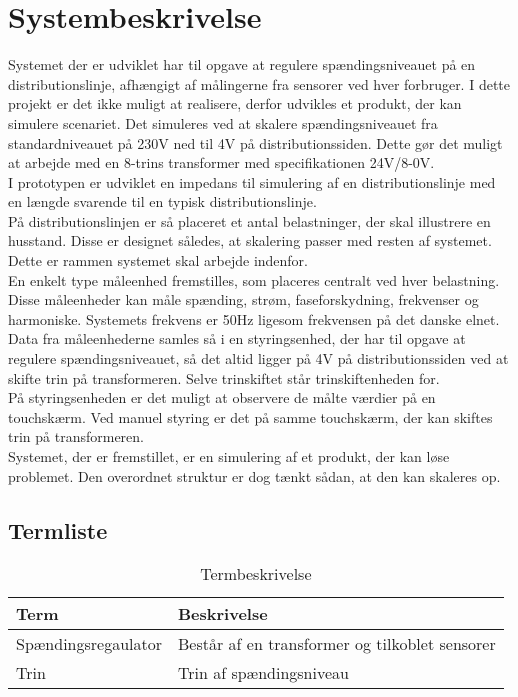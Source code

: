 
\section{Systembeskrivelse}

Systemet der er udviklet har til opgave at regulere spændingsniveauet på en distributionslinje, afhængigt af målingerne fra sensorer ved hver forbruger.
I dette projekt er det ikke muligt at realisere, derfor udvikles et produkt, der kan simulere scenariet. Det simuleres ved at skalere spændingsniveauet fra standardniveauet på 230V ned til 4V på distributionssiden. Dette gør det muligt at arbejde med en 8-trins transformer med specifikationen 24V/8-0V.\\
I prototypen er udviklet en impedans til simulering af en distributionslinje med en længde svarende til en typisk distributionslinje.\\
På distributionslinjen er så placeret et antal belastninger, der skal illustrere en husstand. Disse er designet således, at skalering passer med resten af systemet. Dette er rammen systemet skal arbejde indenfor. \\
En enkelt type måleenhed fremstilles, som placeres centralt   ved hver belastning. Disse måleenheder kan måle spænding, strøm, faseforskydning, frekvenser og harmoniske.  Systemets frekvens er 50Hz ligesom frekvensen på det danske elnet.\\
Data fra måleenhederne samles så i en styringsenhed, der har til opgave at regulere spændingsniveauet, så det altid ligger på 4V på distributionssiden ved at skifte trin på transformeren. Selve trinskiftet står trinskiftenheden for.\\
På styringsenheden er det muligt at observere de målte værdier på en touchskærm. Ved manuel styring er det på samme touchskærm, der kan skiftes trin på transformeren.\\
Systemet, der er fremstillet, er en simulering af et produkt, der kan løse problemet. Den overordnet struktur er dog tænkt sådan, at den kan skaleres op.\\




\subsection{Termliste}

\begin{table}[htbp]
\centering
\begin{tabular}{|l|l|}
\hline
\textbf{Term} 	& \textbf{Beskrivelse} \\\hline
Spændingsregaulator	& Består af en transformer og tilkoblet sensorer \\\hline
Trin 	& Trin af spændingsniveau \\\hline

\end{tabular}
\caption{Termbeskrivelse}
\label{tab:termbeskrivelsen}

\end{table}